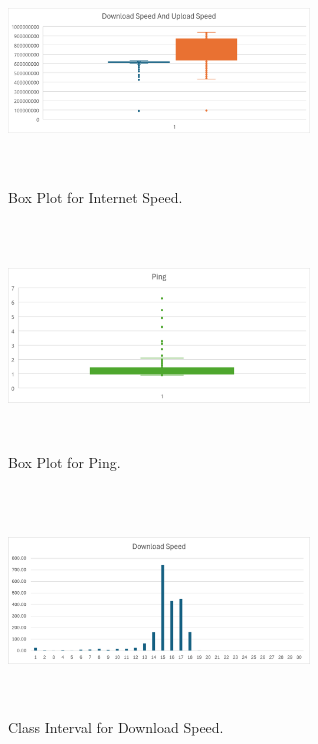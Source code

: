 \documentclass[conference]{IEEEtran}
\begin{document}
\begin{figure}[!htbp]
    \centerline{\includegraphics[width=8cm,height=6cm,keepaspectratio]{Figures/Picture1.png}}
    \caption{Box Plot for Internet Speed.}
    \label{fig2}
\end{figure}

\begin{figure}[!htbp]
    \centerline{\includegraphics[width=8cm,height=6cm,keepaspectratio]{Figures/Picture2.png}}
    \caption{Box Plot for Ping.}
    \label{fig3}
\end{figure}

\begin{figure}[!htbp]
    \centerline{\includegraphics[width=8cm,height=6cm,keepaspectratio]{Figures/Picture3.png}}
    \caption{Class Interval for Download Speed.}
    \label{fig4}
\end{figure}
\end{document}
